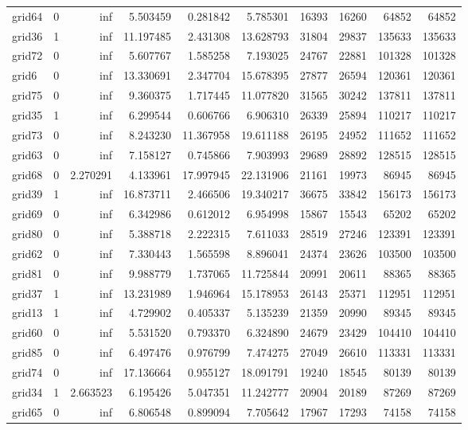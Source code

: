\begin{longtable}{|l|r|r|r|r|r|r|r|r|r|}
grid64 & 0 & inf & 5.503459 & 0.281842 & 5.785301 & 16393 & 16260 & 64852 & 64852 \\
grid36 & 1 & inf & 11.197485 & 2.431308 & 13.628793 & 31804 & 29837 & 135633 & 135633 \\
grid72 & 0 & inf & 5.607767 & 1.585258 & 7.193025 & 24767 & 22881 & 101328 & 101328 \\
grid6 & 0 & inf & 13.330691 & 2.347704 & 15.678395 & 27877 & 26594 & 120361 & 120361 \\
grid75 & 0 & inf & 9.360375 & 1.717445 & 11.077820 & 31565 & 30242 & 137811 & 137811 \\
grid35 & 1 & inf & 6.299544 & 0.606766 & 6.906310 & 26339 & 25894 & 110217 & 110217 \\
grid73 & 0 & inf & 8.243230 & 11.367958 & 19.611188 & 26195 & 24952 & 111652 & 111652 \\
grid63 & 0 & inf & 7.158127 & 0.745866 & 7.903993 & 29689 & 28892 & 128515 & 128515 \\
grid68 & 0 & 2.270291 & 4.133961 & 17.997945 & 22.131906 & 21161 & 19973 & 86945 & 86945 \\
grid39 & 1 & inf & 16.873711 & 2.466506 & 19.340217 & 36675 & 33842 & 156173 & 156173 \\
grid69 & 0 & inf & 6.342986 & 0.612012 & 6.954998 & 15867 & 15543 & 65202 & 65202 \\
grid80 & 0 & inf & 5.388718 & 2.222315 & 7.611033 & 28519 & 27246 & 123391 & 123391 \\
grid62 & 0 & inf & 7.330443 & 1.565598 & 8.896041 & 24374 & 23626 & 103500 & 103500 \\
grid81 & 0 & inf & 9.988779 & 1.737065 & 11.725844 & 20991 & 20611 & 88365 & 88365 \\
grid37 & 1 & inf & 13.231989 & 1.946964 & 15.178953 & 26143 & 25371 & 112951 & 112951 \\
grid13 & 1 & inf & 4.729902 & 0.405337 & 5.135239 & 21359 & 20990 & 89345 & 89345 \\
grid60 & 0 & inf & 5.531520 & 0.793370 & 6.324890 & 24679 & 23429 & 104410 & 104410 \\
grid85 & 0 & inf & 6.497476 & 0.976799 & 7.474275 & 27049 & 26610 & 113331 & 113331 \\
grid74 & 0 & inf & 17.136664 & 0.955127 & 18.091791 & 19240 & 18545 & 80139 & 80139 \\
grid34 & 1 & 2.663523 & 6.195426 & 5.047351 & 11.242777 & 20904 & 20189 & 87269 & 87269 \\
grid65 & 0 & inf & 6.806548 & 0.899094 & 7.705642 & 17967 & 17293 & 74158 & 74158 \\

\end{longtable}

